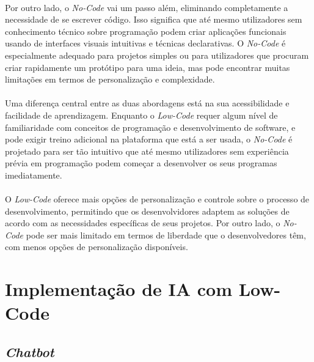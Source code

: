 \documentclass[pdflatex,sn-mathphys-num]{sn-jnl}
\theoremstyle{thmstyleone}
\theoremstyle{thmstyletwo}
\theoremstyle{thmstylethree}
\begin{document}
\paragraph{}Por outro lado, o \textit{No-Code} vai um passo além, eliminando completamente a necessidade de se escrever código. Isso significa que até mesmo utilizadores sem conhecimento técnico sobre programação podem criar aplicações funcionais usando de interfaces visuais intuitivas e técnicas declarativas. O \textit{No-Code} é especialmente adequado para projetos simples ou para utilizadores que procuram criar rapidamente um protótipo para uma ideia, mas pode encontrar muitas limitações em termos de personalização e complexidade.\cite{bib14}

\paragraph{}Uma diferença central entre as duas abordagens está na sua acessibilidade e facilidade de aprendizagem. Enquanto o \textit{Low-Code} requer algum nível de familiaridade com conceitos de programação e desenvolvimento de software, e pode exigir treino adicional na plataforma que está a ser usada, o \textit{No-Code} é projetado para ser tão intuitivo que até mesmo utilizadores sem experiência prévia em programação podem começar a desenvolver os seus programas imediatamente.\cite{bib14}

\paragraph{}O \textit{Low-Code} oferece mais opções de personalização e controle sobre o processo de desenvolvimento, permitindo que os desenvolvidores adaptem as soluções de acordo com as necessidades específicas de seus projetos. Por outro lado, o \textit{No-Code} pode ser mais limitado em termos de liberdade que o desenvolvedores têm, com menos opções de personalização disponíveis.\cite{bib14}



\section{Implementação de IA com Low-Code}
\subsection{\textit{Chatbot}\cite{bib8}}
\end{document}
